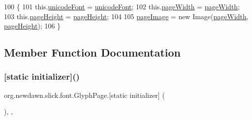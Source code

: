 \begin{DoxyCode}
100                                                                                                    \{
101         this.\mbox{\hyperlink{classorg_1_1newdawn_1_1slick_1_1font_1_1_glyph_page_a24df618c9e902dd841e708d572559641}{unicodeFont}} = \mbox{\hyperlink{classorg_1_1newdawn_1_1slick_1_1font_1_1_glyph_page_a24df618c9e902dd841e708d572559641}{unicodeFont}};
102         this.\mbox{\hyperlink{classorg_1_1newdawn_1_1slick_1_1font_1_1_glyph_page_a92a417a19c115ae906499f7d8c026130}{pageWidth}} = \mbox{\hyperlink{classorg_1_1newdawn_1_1slick_1_1font_1_1_glyph_page_a92a417a19c115ae906499f7d8c026130}{pageWidth}};
103         this.\mbox{\hyperlink{classorg_1_1newdawn_1_1slick_1_1font_1_1_glyph_page_a87d58eab40df58d9ad0d1cd5f2d0db3b}{pageHeight}} = \mbox{\hyperlink{classorg_1_1newdawn_1_1slick_1_1font_1_1_glyph_page_a87d58eab40df58d9ad0d1cd5f2d0db3b}{pageHeight}};
104 
105         \mbox{\hyperlink{classorg_1_1newdawn_1_1slick_1_1font_1_1_glyph_page_a9ca6f69c7df1769fe54cbd6a13f46645}{pageImage}} = \textcolor{keyword}{new} Image(\mbox{\hyperlink{classorg_1_1newdawn_1_1slick_1_1font_1_1_glyph_page_a92a417a19c115ae906499f7d8c026130}{pageWidth}}, \mbox{\hyperlink{classorg_1_1newdawn_1_1slick_1_1font_1_1_glyph_page_a87d58eab40df58d9ad0d1cd5f2d0db3b}{pageHeight}});
106     \}
\end{DoxyCode}


\subsection{Member Function Documentation}
\mbox{\label{classorg_1_1newdawn_1_1slick_1_1font_1_1_glyph_page_acc727475850f1b225b4dd58b627838d7}} 
\subsubsection{\texorpdfstring{[static initializer]()}{[static initializer]()}\hspace{0.1cm}{\footnotesize\ttfamily [1/2]}}
{\footnotesize\ttfamily org.\+newdawn.\+slick.\+font.\+Glyph\+Page.\mbox{[}static initializer\mbox{]} (\begin{DoxyParamCaption}{ }\end{DoxyParamCaption})\hspace{0.3cm}{\ttfamily [inline]}, {\ttfamily [static]}, {\ttfamily [package]}}

